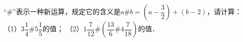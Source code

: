 “$\#$”表示一种新运算，规定它的含义是$a\#b=\left(a-\dfrac{3}{2}\right)+\left(b-2\right)$，请计算：\\
（1）$3\dfrac{1}{4}\#5\dfrac{1}{5}$的值； \hspace{4cm}   （2）$1\dfrac{7}{12}\#\left(\dfrac{13}{6}\#4\dfrac{7}{18}\right)$的值．